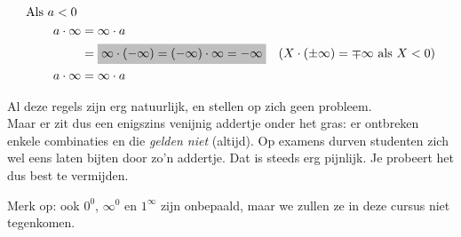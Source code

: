 \documentclass{ximera}
\begin{document}
\begin{proposition}
\begin{align*}
	\mbox{Als $a<0$ } \\%
		a\cdot\infty & = \infty\cdot a \\
	& = \important{\infty \cdot (-\infty) = (-\infty)\cdot\infty = -\infty} & \text{($X\cdot(\pm\infty) = \mp\infty$ als $X<0$)} \\
			a\cdot\infty & = \infty\cdot a \\
	\end{align*}	
\end{proposition}  

Al deze regels zijn erg natuurlijk, en stellen op zich geen probleem. \\
Maar er zit dus een enigszins venijnig addertje onder het gras: er ontbreken enkele combinaties en die \textit{gelden niet} (altijd). Op examens durven studenten zich wel eens laten bijten door zo'n addertje. Dat is steeds erg pijnlijk. Je probeert het dus best te vermijden.

Merk op: ook $0^0$, $\infty^0$ en $1^\infty$ zijn onbepaald, maar we zullen ze in deze cursus niet tegenkomen.
\end{document}
